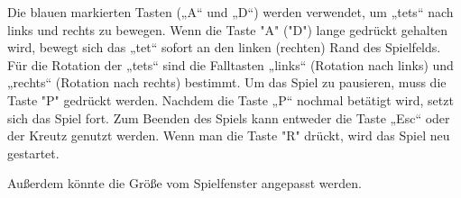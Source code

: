 \documentclass[11pt]{article}
\begin{document}
Die blauen markierten Tasten („A“ und „D“) werden verwendet, um „\glspl {tet}“ nach links und rechts zu bewegen. Wenn die Taste "A" ("D") lange gedrückt gehalten wird, bewegt sich das „\gls {tet}“ sofort an den linken (rechten) Rand des Spielfelds. Für die Rotation der „\glspl {tet}“ sind die Falltasten „links“ (Rotation nach links) und „rechts“ (Rotation nach rechts) bestimmt.  Um das Spiel zu pausieren, muss die Taste "P" gedrückt werden. Nachdem die Taste „P“ nochmal betätigt wird, setzt sich das Spiel fort. Zum Beenden des Spiels kann entweder die Taste „Esc“ oder der Kreutz genutzt werden.  Wenn man die Taste "R" drückt, wird das Spiel neu gestartet.  

Außerdem könnte die Größe vom Spielfenster angepasst werden.  


\pagebreak

\end{document}
